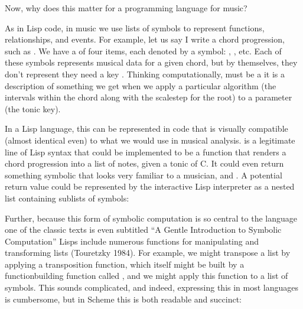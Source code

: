 \documentclass[letterpaper,10pt,english]{sphinxmanual}
\begin{document}
\sphinxAtStartPar
Now, why does this matter for a programming language for music?

\sphinxAtStartPar
As in Lisp code, in music we use lists of symbols to represent functions, relationships, and events.
For example, let us say I write a chord progression, such as .
We have a  of four items, each denoted by a symbol: , , etc.
Each of these symbols represents musical data for a given chord, but by themselves, they don’t represent  \sphinxhyphen{}
they need a key .
Thinking computationally,  must be a  \sphinxhyphen{} it is a description of something we get when we apply a
particular algorithm (the intervals within the chord along with the scale\sphinxhyphen{}step for the root) to a parameter (the tonic key).

\sphinxAtStartPar
In a Lisp language, this can be represented in code that is visually compatible (almost identical even) to what we would use in musical analysis.
 is a legitimate line of Lisp syntax that could be implemented to be a function
that renders a chord progression into a list of notes, given a tonic of C.
It could even return something symbolic that looks very familiar to a musician, and .
A potential return value could be represented by the interactive Lisp interpreter as a nested list containing sub\sphinxhyphen{}lists of symbols:

\sphinxAtStartPar
Further, because this form of symbolic computation is so central to the language \sphinxhyphen{} one of the classic texts is even subtitled
“A Gentle Introduction to Symbolic Computation” \sphinxhyphen{} Lisps include numerous functions for manipulating and transforming lists (Touretzky 1984).
For example, we might transpose a list by applying a transposition function, which itself might be built by a function\sphinxhyphen{}building function
called , and we might apply this function to a list of symbols.
This sounds complicated, and indeed, expressing this in most languages is cumbersome, but in Scheme this is both readable and succinct:
\end{document}
